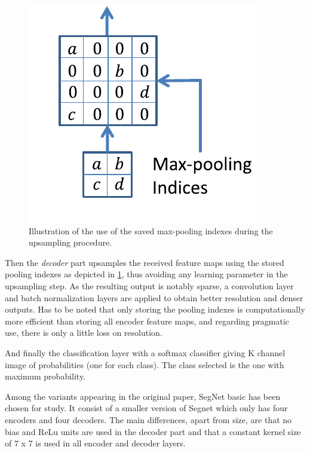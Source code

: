 \documentclass[12pt,a4paper]{article}
\begin{document}
\begin{figure}[!htbp]
\begin{center}
\includegraphics[scale=0.5]{seg_idx.png}
\caption{Illustration of the use of the saved max-pooling indexes during the upsampling procedure.}
\label{segidx}
\end{center}
\end{figure}

Then the \textit{decoder} part upsamples the received feature maps using the stored pooling indexes as depicted in \ref{segidx}, thus avoiding any learning parameter in the upsampling step. As the resulting output is notably sparse, a convolution layer and batch normalization layers are applied to obtain better resolution and denser outputs. Has to be noted that only storing the pooling indexes is computationally more efficient than storing all encoder feature maps, and regarding pragmatic use, there is only a little loss on resolution.\newline 

And finally the classification layer with a softmax classifier giving K channel image of probabilities (one for each class). The class selected is the one with maximum probability.\newline

Among the variants appearing in the original paper, SegNet basic has been chosen for study. It consist of a smaller version of Segnet which only has four encoders and four decoders. The main differences, apart from size, are that no bias and ReLu units are used in the decoder part and that a constant kernel size of 7 x 7 is used in all encoder and decoder layers.\newline
\end{document}
